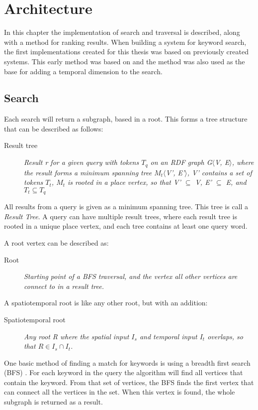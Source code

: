 \chapter{Architecture}
\label{cha:architecture}
In this chapter the implementation of search and traversal is described, along with a method for ranking results. When building a system for keyword search, the first implementations created for this thesis was based on previously created systems. This early method was based on \cite{Shi:2016:TRS:2882903.2882941} and the method was also used as the base for adding a temporal dimension to the search.

\section{Search}
Each search will return a subgraph, based in a root. This forms a tree structure that can be described as follows:
\begin{description}
    \item[Result tree] {\em Result r for a given query with tokens $T_q$ on an RDF graph G$\langle$V, E$\rangle$, where the result forms a minimum spanning tree $M_t\langle$V', E'$\rangle$, V' contains a set of tokens $T_t$, $M_t$ is rooted in a place vertex, so that V' $\subseteq$ V, E' $\subseteq$ E, and $T_t \subseteq T_q$}
\end{description}
All results from a query is given as a minimum spanning tree. This tree is call a {\em Result Tree}. A query can have multiple result trees, where each result tree is rooted in a unique place vertex, and each tree contains at least one query word.

A root vertex can be described as:
\begin{description}
    \item[Root] {\em Starting point of a BFS traversal, and the vertex all other vertices are connect to in a result tree.}
\end{description}

A spatiotemporal root is like any other root, but with an addition:
\begin{description}
    \item[Spatiotemporal root\label{rootST}] {\em Any root R where the spatial input $I_s$ and temporal input $I_t$ overlaps, so that $R \in I_s \cap I_t$.}
\end{description}

One basic method of finding a match for keywords is using a breadth first search (BFS) \citep{blinks, Shi:2016:TRS:2882903.2882941}. For each keyword in the query the algorithm will find all vertices that contain the keyword. From that set of vertices, the BFS finds the first vertex that can connect all the vertices in the set. When this vertex is found, the whole subgraph is returned as a result.

